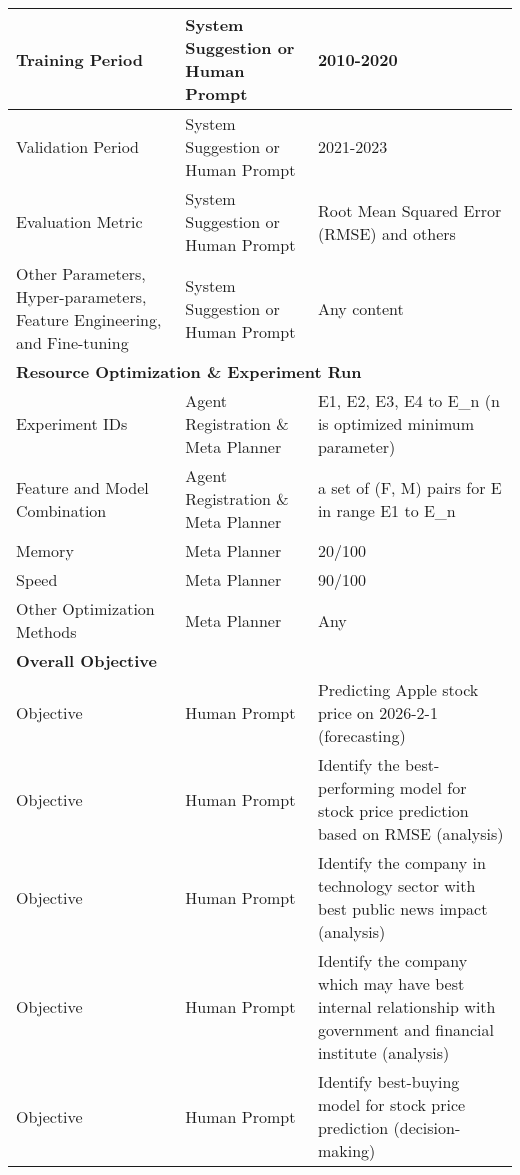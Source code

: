 \begin{table*}[th!]
\begin{tabular}{|p{3.6cm}|p{3.0cm}|p{5.2cm}|}
\hline
Training Period & System Suggestion or Human Prompt & 2010-2020 \\
\hline
Validation Period & System Suggestion or Human Prompt & 2021-2023 \\
\hline
Evaluation Metric & System Suggestion or Human Prompt & Root Mean Squared Error (RMSE) and others \\
\hline
Other Parameters, Hyper-parameters, Feature Engineering, and Fine-tuning & System Suggestion or Human Prompt & Any content\\
\hline
\multicolumn{3}{|l|}{\textbf{Resource Optimization  \& Experiment Run}} \\
\hline
Experiment IDs & Agent Registration \& Meta Planner & E1, E2, E3, E4 to E\_n (n is optimized minimum parameter) \\
\hline
Feature and Model Combination & Agent Registration \& Meta Planner  & {a set of (F, M) pairs} for E in range E1 to E\_n \\
\hline
Memory & Meta Planner & 20/100 \\
\hline
Speed & Meta Planner & 90/100 \\
\hline
Other Optimization Methods & Meta Planner & Any \\
\hline
\multicolumn{3}{|l|}{\textbf{Overall Objective}} \\
\hline
Objective & Human Prompt & Predicting Apple stock price on 2026-2-1 (forecasting) \\
\hline
Objective & Human Prompt & Identify the best-performing model for stock price prediction based on RMSE (analysis) \\
\hline
Objective & Human Prompt & Identify the company in technology sector with best public news impact (analysis) \\
\hline
Objective & Human Prompt & Identify the company which may have best internal relationship with government and financial institute (analysis) \\
\hline
Objective & Human Prompt & Identify best-buying model for stock price prediction (decision-making) \\
\hline
\end{tabular}
\end{table*}
